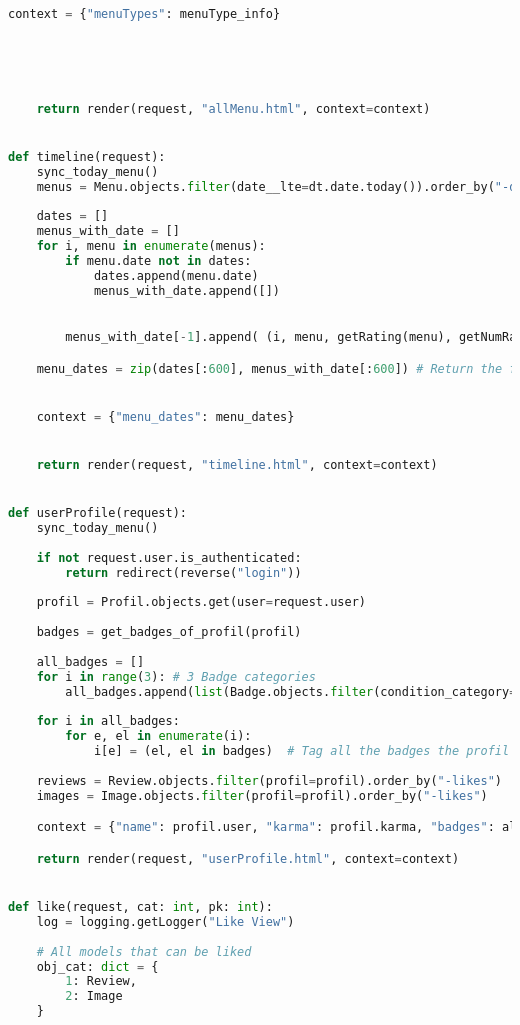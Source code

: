 \begin{lstlisting}[language=Python]
    context = {"menuTypes": menuType_info}


    
   

    return render(request, "allMenu.html", context=context)


def timeline(request):
    sync_today_menu()
    menus = Menu.objects.filter(date__lte=dt.date.today()).order_by("-date")
    
    dates = []
    menus_with_date = []
    for i, menu in enumerate(menus):
        if menu.date not in dates:
            dates.append(menu.date)
            menus_with_date.append([])
        

        menus_with_date[-1].append( (i, menu, getRating(menu), getNumRates(menu)) )

    menu_dates = zip(dates[:600], menus_with_date[:600]) # Return the first 600 menus


    context = {"menu_dates": menu_dates}  


    return render(request, "timeline.html", context=context)


def userProfile(request):
    sync_today_menu()
    
    if not request.user.is_authenticated:
        return redirect(reverse("login"))
    
    profil = Profil.objects.get(user=request.user)
    
    badges = get_badges_of_profil(profil)
    
    all_badges = []
    for i in range(3): # 3 Badge categories
        all_badges.append(list(Badge.objects.filter(condition_category=i).order_by("count")))
        
    for i in all_badges:
        for e, el in enumerate(i):
            i[e] = (el, el in badges)  # Tag all the badges the profil posses
    
    reviews = Review.objects.filter(profil=profil).order_by("-likes")
    images = Image.objects.filter(profil=profil).order_by("-likes")

    context = {"name": profil.user, "karma": profil.karma, "badges": all_badges, "images": images, "reviews": reviews}

    return render(request, "userProfile.html", context=context)


def like(request, cat: int, pk: int):
    log = logging.getLogger("Like View")
    
    # All models that can be liked
    obj_cat: dict = {
        1: Review,
        2: Image
    }
    

\end{lstlisting}
